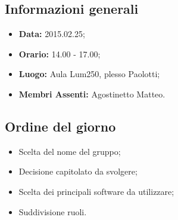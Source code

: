 \subsection{Informazioni generali}
\begin{itemize}
	\item \textbf{Data:} 2015.02.25;
	\item \textbf{Orario:} 14.00 - 17.00;
	\item \textbf{Luogo:} Aula Lum250, plesso Paolotti;
	\item \textbf{Membri Assenti:} Agostinetto Matteo.
\end{itemize}

\subsection{Ordine del giorno}
\begin{itemize}
	\item Scelta del nome del gruppo;
	\item Decisione capitolato da svolgere;
	\item Scelta dei principali software da utilizzare;
	\item Suddivisione ruoli.
\end{itemize}







